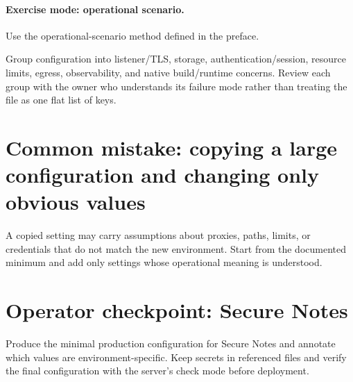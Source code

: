 \paragraph{Exercise mode: operational scenario.} Use the operational-scenario method defined in the preface.

Group configuration into listener/TLS, storage, authentication/session, resource limits, egress, observability, and native build/runtime concerns. Review each group with the owner who understands its failure mode rather than treating the file as one flat list of keys.

\section{Common mistake: copying a large configuration and changing only obvious values}
A copied setting may carry assumptions about proxies, paths, limits, or credentials that do not match the new environment. Start from the documented minimum and add only settings whose operational meaning is understood.

\section{Operator checkpoint: Secure Notes}
Produce the minimal production configuration for Secure Notes and annotate which values are environment-specific. Keep secrets in referenced files and verify the final configuration with the server's check mode before deployment.
